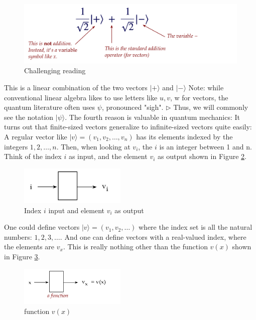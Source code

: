 \documentclass[main.tex]{subfiles}
\begin{document}
    \begin{figure}
        \centering
        \includegraphics[width=5in]{notes/figs/n04/09dirac7.png}
        \caption{Challenging reading}
        \label{fig:09dirac7}
    \end{figure}
    
    This is a linear combination of the two vectors $|+\rangle$ and $|-\rangle$ Note: while conventional linear algebra likes to use letters like $u, v$, w for vectors, the quantum literature often uses $\psi$, pronounced "sigh". $\triangleright$ Thus, we will commonly see the notation $|\psi\rangle$. The fourth reason is valuable in quantum mechanics: It turns out that finite-sized vectors generalize to infinite-sized vectors quite easily: A regular vector like $|v\rangle=\left(v_{1}, v_{2}, \ldots, v_{n}\right)$ has its elements indexed by the integers $1,2, \ldots, n$. Then, when looking at $v_{i}$, the $i$ is an integer between 1 and $\mathrm{n}$. Think of the index $i$ as input, and the element $v_{i}$ as output shown in Figure \ref{fig:10dirac5}.
    
    \begin{figure}
        \centering
        \includegraphics[width=2in]{notes/figs/n04/10dirac5.png}
        \caption{Index $i$ input and element $v_{i}$ as output}
        \label{fig:10dirac5}
    \end{figure}
    
    One could define vectors $|v\rangle=\left(v_{1}, v_{2}, \ldots\right)$ where the index set is all the natural numbers: $1,2,3, \ldots$. And one can define vectors with a real-valued index, where the elements are $v_{x}$. This is really nothing other than the function $v(x)$ shown in Figure \ref{fig:11dirac6}.
    
    \begin{figure}
        \centering
        \includegraphics[width=2in]{notes/figs/n04/11dirac6.png}
        \caption{function $v(x)$}
        \label{fig:11dirac6}
    \end{figure}
    
\end{document}

